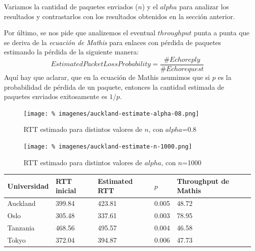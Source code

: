 \documentclass[final,inline,a4paper,narroweqnarray]{ieee}
\begin{document}
Variamos la cantidad de paquetes enviados ($n$) y el $alpha$ para analizar los
resultados y contrastarlos con los resultados obtenidos en la sección anterior.

Por último, se nos pide que analizemos el eventual $throughput$ punta a punta
que se deriva de la \emph{ecuación de Mathis} para enlaces con pérdida de
paquetes estimando la pérdida de la siguiente manera:
\[
EstimatedPacketLossProbability = \dfrac{\#Echo reply}{\#Echo request}
\]
Aquí hay que aclarar, que en la ecuación de Mathis asumimos que si $p$ es la
probabilidad de pérdida de un paquete, entonces la cantidad estimada de paquetes
enviados exitosamente es $1/p$.

\begin{figure}[ht]\begin{center}
   \texttt{[image: \%
    imagenes/auckland-estimate-alpha-08.png]}
    \caption{RTT estimado para distintos valores de $n$, con $alpha$=0.8}
    \label{auckland-estimate-alpha-08}
\end{center}\end{figure}

\begin{figure}[ht]\begin{center}
   \texttt{[image: \%
    imagenes/auckland-estimate-n-1000.png]}
    \caption{RTT estimado para distintos valores de $alpha$, con $n$=1000}
    \label{auckland-estimate-n-1000}
\end{center}\end{figure}

\begin{tabular}{| p{1.6cm} | p{1.2cm} | p{1.4cm} | p{1.2cm} | p{1.7cm} |}
  \hline
  Universidad & RTT inicial & Estimated RTT & $p$ & Throughput de Mathis \\
  \hline
  Auckland & 399.84 & 423.81 & 0.005 & 48.72 \\
  Oslo & 305.48 & 337.61 & 0.003 & 78.95 \\
  Tanzania & 468.56 & 495.57 & 0.004 & 46.58 \\
  Tokyo & 372.04 & 394.87 & 0.006 & 47.73 \\
  \hline
\end{tabular}
\end{document}
